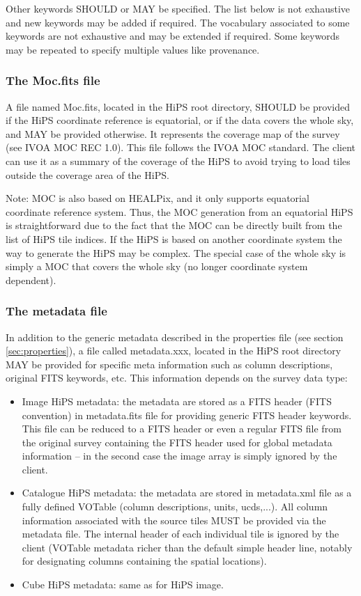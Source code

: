 \documentclass[11pt,a4paper]{ivoa}
\begin{document}
Other keywords SHOULD or MAY be specified. The list below is not exhaustive and new keywords may be added if required. The vocabulary associated to some keywords are not exhaustive and may be extended if required. Some keywords may be repeated to specify multiple values like provenance.

\subsubsection{The Moc.fits file}

A file named Moc.fits, located in the HiPS root directory, SHOULD be provided if the HiPS coordinate reference is equatorial, or if the data covers the whole sky, and MAY be provided otherwise. It represents the coverage map of the survey (see IVOA MOC REC 1.0). This file follows the IVOA MOC standard. The client can use it as a summary of the coverage of the HiPS to avoid trying to load tiles outside the coverage area of the HiPS.

Note: MOC is also based on HEALPix, and it only supports equatorial coordinate reference system. Thus, the MOC generation from an equatorial HiPS is straightforward due to the fact that the MOC can be directly built from the list of HiPS tile indices. If the HiPS is based on another coordinate system the way to generate the HiPS may be complex. The special case of the whole sky is simply a MOC that covers the whole sky (no longer coordinate system dependent).

\subsubsection{The metadata file}

In addition to the generic metadata described in the properties file (see section \ref{sec:properties}), a file called metadata.xxx, located in the HiPS root directory MAY be provided for specific meta information such as column descriptions, original FITS keywords, etc. This information depends on the survey data type:

\begin{itemize}
\item Image HiPS metadata: the metadata are stored as a FITS header (FITS convention) in metadata.fits file for providing generic FITS header keywords. This file can be reduced to a FITS header or even a regular FITS file from the original survey containing the FITS header used for global metadata information -- in the second case the image array is simply ignored by the client.

\item Catalogue HiPS metadata: the metadata are stored in metadata.xml file as a fully defined VOTable (column descriptions, units, ucds,...). All column information associated with the source tiles MUST be provided via the metadata file. The internal header of each individual tile is ignored by the client (VOTable metadata richer than the default simple header line, notably for designating columns containing the spatial locations).

\item Cube HiPS metadata: same as for HiPS image.
\end{itemize}
\end{document}
